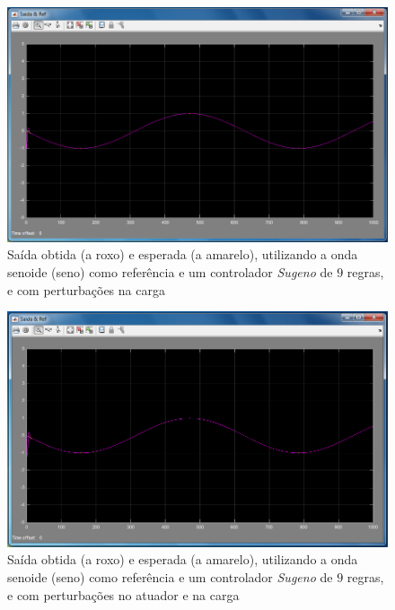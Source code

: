 \documentclass{article}
\begin{document}
\begin{figure}[h]
  \centering
      \includegraphics[scale=0.3]{Images/Sugeno_9_sin_charge.png}
  \caption{Saída obtida (a roxo) e esperada (a amarelo), utilizando a onda senoide (seno) como referência e um controlador \emph{Sugeno} de $9$ regras, e com perturbações na carga}
\end{figure}

\begin{figure}[h]
  \centering
      \includegraphics[scale=0.3]{Images/Sugeno_9_sin_actuator_charge.png}
  \caption{Saída obtida (a roxo) e esperada (a amarelo), utilizando a onda senoide (seno) como referência e um controlador \emph{Sugeno} de $9$ regras, e com perturbações no atuador e na carga}
\end{figure}

\end{document}
